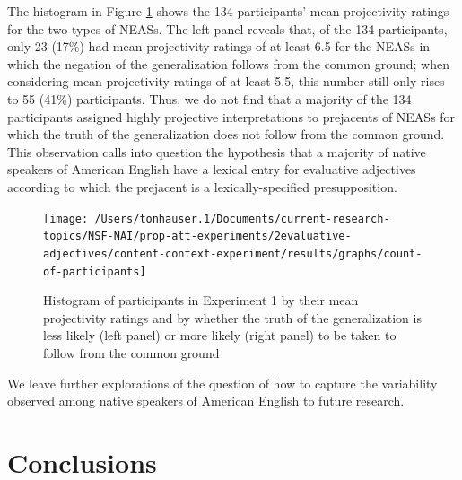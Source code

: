 \documentclass[11pt,fleqn]{article}
\newcommand{\6}{\mbox{$[\hspace*{-.6mm}[$}}
\newcommand{\9}{\mbox{$]\hspace*{-.6mm}]$}}
\begin{document}
The histogram in Figure \ref{f-dialect} shows the 134 participants' mean projectivity ratings for the two types of NEASs. The left panel reveals that, of the 134 participants, only 23 (17\%) had mean projectivity ratings of at least 6.5 for the NEASs in which the negation of the generalization follows from the common ground; when considering mean projectivity ratings of at least 5.5, this number still only rises to 55 (41\%) participants. Thus, we do not find that a majority of the 134 participants assigned highly projective interpretations to prejacents of NEASs for which the truth of the generalization does not follow from the common ground. This observation calls into question the hypothesis that a majority of native speakers of American English have a lexical entry for evaluative adjectives according to which the prejacent is a lexically-specified presupposition. 

\begin{figure}[h!]
\begin{center}
\texttt{[image: /Users/tonhauser.1/Documents/current-research-topics/NSF-NAI/prop-att-experiments/2evaluative-adjectives/content-context-experiment/results/graphs/count-of-participants]}

\caption{Histogram of participants in Experiment 1 by their mean projectivity ratings and by whether the truth of the generalization is less likely (left panel) or more likely (right panel) to be taken to follow from the common ground}\label{f-dialect}
\end{center}
\end{figure}

We leave further explorations of the question of how to capture the variability observed among native speakers of American English to future research.

\section{Conclusions}\label{s6}
\end{document}

